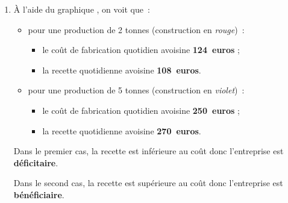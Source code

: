 \begin{corrige}
\begin{enumerate}
\begin{center}
\end{center}
          \par
          \item \`A l'aide du graphique , on voit que~:
          \begin{itemize}
               \item pour une production de 2 tonnes (construction en \textit{rouge})~:
               \begin{itemize}[label=---]
                    \item le coût de fabrication quotidien avoisine \textbf{124~euros} ;
                    \item la recette quotidienne avoisine \textbf{108~euros}.
               \end{itemize}
               \item pour une production de 5 tonnes (construction en \textit{violet})~:
               \begin{itemize}[label=---]
                    \item le coût de fabrication quotidien avoisine \textbf{250~euros} ;
                    \item la recette quotidienne avoisine \textbf{270~euros}.
               \end{itemize}
               \par
          \end{itemize}
          \par
          Dans le premier cas, la recette est inférieure au coût donc l'entreprise est \textbf{déficitaire}.
          \par
          Dans le second cas, la recette est supérieure au coût donc l'entreprise est \textbf{bénéficiaire}.
          \par
\end{enumerate}
\end{corrige}
